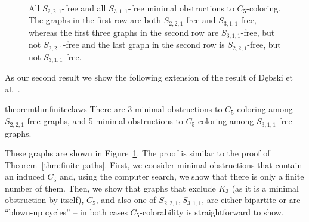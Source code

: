 \documentclass[11pt,a4paper]{article}
\theoremstyle{mystyle}
\newtheorem{theorem}{Theorem}[section]
\begin{document}
\begin{figure}[h!]
\begin{center}
 \quad
\end{center}
\caption{All $S_{2,2,1}$-free and all $S_{3,1,1}$-free minimal obstructions to $C_5$-coloring. The graphs in the first row are both $S_{2,2,1}$-free and $S_{3,1,1}$-free, whereas the first three graphs in the second row are $S_{3,1,1}$-free, but not $S_{2,2,1}$-free and the last graph in the second row is $S_{2,2,1}$-free, but not $S_{3,1,1}$-free.}
\label{fig:S221AndS311FreeObstructions}
\end{figure}

As our second result we show the following extension of the result of D\k{e}bski et al.~\cite{debski_et_al:LIPIcs.ISAAC.2022.14}.
  \begin{restatable}{theorem}{thmfiniteclaws}
  \label{thm:finite-claws}
    There are  3 minimal obstructions to $C_5$-coloring among $S_{2,2,1}$-free graphs, and
    5 minimal obstructions to $C_5$-coloring among $S_{3,1,1}$-free graphs.
  \end{restatable}
These graphs are shown in Figure~\ref{fig:S221AndS311FreeObstructions}. The proof is similar to the proof of Theorem~\ref{thm:finite-paths}.
First, we consider minimal obstructions that contain an induced $C_5$ and, using the computer search, we show that there is only a finite number of them.
Then, we show that graphs that exclude $K_3$ (as it is a minimal obstruction by itself), $C_5$, and also one of $S_{2,2,1}, S_{3,1,1}$, are either bipartite or are ``blown-up cycles'' -- in both cases $C_5$-colorability is straightforward to show.
\end{document}
